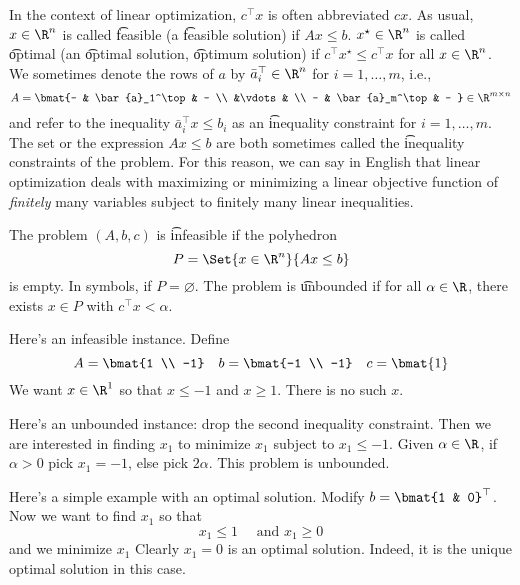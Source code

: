 In the context of linear optimization, $c^\top x$ is often abbreviated $cx$.
As usual, $x \in \R ^n$ is called \t{feasible} (a \t{feasible solution}) if $Ax \leq b$.
$x^\star \in \R ^n$ is called \t{optimal} (an \t{optimal solution}, \t{optimum solution}) if $c^\top x^\star \leq c^\top x$ for all $x \in \R ^n$.
We sometimes denote the rows of $a$ by $\bar{a}_i^\top  \in \R ^n$ for $i = 1, \dots , m$, i.e.,
\[
A = \bmat{- & \bar{a}_1^\top  & - \\ &\vdots& \\ - & \bar{a}_m^\top  & - } \in \R ^{m \times  n}
\]
and refer to the inequality $\bar{a}_i^\top  x \leq b_i$ as an \t{inequality constraint} for $i = 1, \dots , m$.
The set or the expression $Ax \leq b$ are both sometimes called the \t{inequality constraints} of the problem.
For this reason, we can say in English that linear optimization deals with maximizing or minimizing a linear objective function of \textit{finitely} many variables subject to finitely many linear inequalities.

The problem $(A, b, c)$ is \t{infeasible} if the polyhedron
\[
P = \Set{x \in \R ^n}{Ax \leq b}
\]
is empty.
In symbols, if $P = \varnothing$.
The problem is \t{unbounded} if for all $\alpha  \in \R $, there exists $x \in P$ with $c^\top x < \alpha $.

Here's an infeasible instance. Define
\[
A = \bmat{1 \\ -1} \quad b = \bmat{-1 \\ -1} \quad c = \bmat{1}
\]
We want $x \in \R ^1$ so that $x \leq -1$ and $x \geq 1$.
There is no such $x$.

Here's an unbounded instance: drop the second inequality constraint.
Then we are interested in finding $x_1$ to minimize $x_1$ subject to $x_1 \leq -1$.
Given $\alpha  \in \R $, if $\alpha  > 0$ pick $x_1 = -1$, else pick $2\alpha $.
This problem is unbounded.

Here's a simple example with an optimal solution.
Modify $b = \bmat{1 & 0}^\top $.
Now we want to find $x_1$ so that
\[
x_1 \leq 1 \quad \text{ and } x_1 \geq 0
\]
and we minimize $x_1$
Clearly $x_1 = 0$ is an optimal solution.
Indeed, it is the unique optimal solution in this case.
